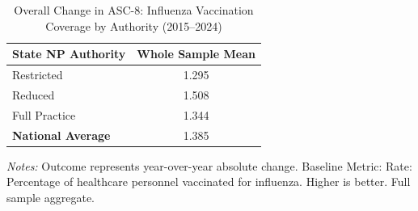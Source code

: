 \begin{table}[htbp]
    \centering
    \caption{Overall Change in ASC-8: Influenza Vaccination Coverage by Authority (2015--2024)}
    \label{tab:d_asc_rate_8_full}
    \vspace{0.2cm}
    \begin{tabular}{lc}
        \toprule
        \textbf{State NP Authority} & \textbf{Whole Sample Mean} \\
        \midrule
        Restricted & 1.295 \\
        Reduced & 1.508 \\
        Full Practice & 1.344 \\
        \midrule
        \textbf{National Average} & 1.385 \\
        \bottomrule
    \end{tabular}
    \vspace{0.1cm}
    \begin{minipage}{0.6\textwidth}
        \footnotesize \textit{Notes:} Outcome represents year-over-year absolute change. Baseline Metric: Rate: Percentage of healthcare personnel vaccinated for influenza. Higher is better. Full sample aggregate.
    \end{minipage}
\end{table}